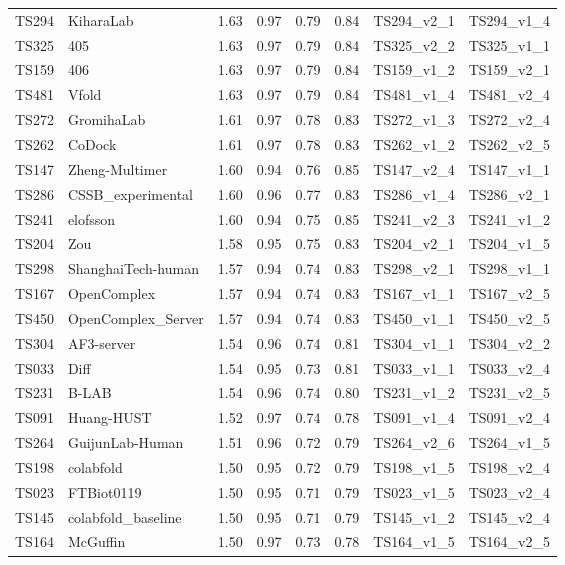 \begin{table}[ht]
{\begin{tabular}{llllllll}
TS294 & KiharaLab & 1.63 & 0.97 & 0.79 & 0.84 & TS294\_v2\_1 & TS294\_v1\_4 \\ 
TS325 & 405 & 1.63 & 0.97 & 0.79 & 0.84 & TS325\_v2\_2 & TS325\_v1\_1 \\ 
TS159 & 406 & 1.63 & 0.97 & 0.79 & 0.84 & TS159\_v1\_2 & TS159\_v2\_1 \\ 
TS481 & Vfold & 1.63 & 0.97 & 0.79 & 0.84 & TS481\_v1\_4 & TS481\_v2\_4 \\ 
TS272 & GromihaLab & 1.61 & 0.97 & 0.78 & 0.83 & TS272\_v1\_3 & TS272\_v2\_4 \\ 
TS262 & CoDock & 1.61 & 0.97 & 0.78 & 0.83 & TS262\_v1\_2 & TS262\_v2\_5 \\ 
TS147 & Zheng-Multimer & 1.60 & 0.94 & 0.76 & 0.85 & TS147\_v2\_4 & TS147\_v1\_1 \\ 
TS286 & CSSB\_experimental & 1.60 & 0.96 & 0.77 & 0.83 & TS286\_v1\_4 & TS286\_v2\_1 \\ 
TS241 & elofsson & 1.60 & 0.94 & 0.75 & 0.85 & TS241\_v2\_3 & TS241\_v1\_2 \\ 
TS204 & Zou & 1.58 & 0.95 & 0.75 & 0.83 & TS204\_v2\_1 & TS204\_v1\_5 \\ 
TS298 & ShanghaiTech-human & 1.57 & 0.94 & 0.74 & 0.83 & TS298\_v2\_1 & TS298\_v1\_1 \\ 
TS167 & OpenComplex & 1.57 & 0.94 & 0.74 & 0.83 & TS167\_v1\_1 & TS167\_v2\_5 \\ 
TS450 & OpenComplex\_Server & 1.57 & 0.94 & 0.74 & 0.83 & TS450\_v1\_1 & TS450\_v2\_5 \\ 
TS304 & AF3-server & 1.54 & 0.96 & 0.74 & 0.81 & TS304\_v1\_1 & TS304\_v2\_2 \\ 
TS033 & Diff & 1.54 & 0.95 & 0.73 & 0.81 & TS033\_v1\_1 & TS033\_v2\_4 \\ 
TS231 & B-LAB & 1.54 & 0.96 & 0.74 & 0.80 & TS231\_v1\_2 & TS231\_v2\_5 \\ 
TS091 & Huang-HUST & 1.52 & 0.97 & 0.74 & 0.78 & TS091\_v1\_4 & TS091\_v2\_4 \\ 
TS264 & GuijunLab-Human & 1.51 & 0.96 & 0.72 & 0.79 & TS264\_v2\_6 & TS264\_v1\_5 \\ 
TS198 & colabfold & 1.50 & 0.95 & 0.72 & 0.79 & TS198\_v1\_5 & TS198\_v2\_4 \\ 
TS023 & FTBiot0119 & 1.50 & 0.95 & 0.71 & 0.79 & TS023\_v1\_5 & TS023\_v2\_4 \\ 
TS145 & colabfold\_baseline & 1.50 & 0.95 & 0.71 & 0.79 & TS145\_v1\_2 & TS145\_v2\_4 \\ 
TS164 & McGuffin & 1.50 & 0.97 & 0.73 & 0.78 & TS164\_v1\_5 & TS164\_v2\_5 \\ 

\end{tabular}}
\end{table}
